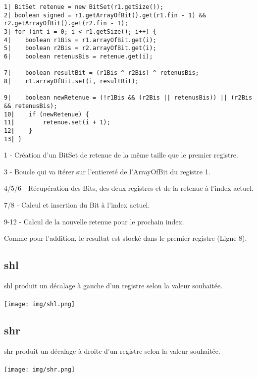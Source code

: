 \documentclass{article}
\begin{document}
\begin{verbatim}
1| BitSet retenue = new BitSet(r1.getSize());
2| boolean signed = r1.getArrayOfBit().get(r1.fin - 1) && r2.getArrayOfBit().get(r2.fin - 1);
3| for (int i = 0; i < r1.getSize(); i++) {
4|    boolean r1Bis = r1.arrayOfBit.get(i);
5|    boolean r2Bis = r2.arrayOfBit.get(i);
6|    boolean retenusBis = retenue.get(i);

7|    boolean resultBit = (r1Bis ^ r2Bis) ^ retenusBis;
8|    r1.arrayOfBit.set(i, resultBit);

9|    boolean newRetenue = (!r1Bis && (r2Bis || retenusBis)) || (r2Bis && retenusBis);
10|    if (newRetenue) {
11|        retenue.set(i + 1);
12|    }
13| }
\end{verbatim}

1 - Création d'un BitSet de retenue de la même taille que le premier registre.

3 - Boucle qui va itérer sur l'entiereté de l'ArrayOfBit du registre 1.

4/5/6 - Récupération des Bits, des deux registres et de la retenue à l'index actuel.

7/8 - Calcul et insertion du Bit à l'index actuel.

9-12 - Calcul de la nouvelle retenue pour le prochain index.

Comme pour l'addition, le resultat est stocké dans le premier registre (Ligne 8).

\newpage
\subsection{shl}
shl produit un décalage à gauche d'un registre selon la valeur souhaitée.
\\
\\
\texttt{[image: img/shl.png]}

\subsection{shr}
shr produit un décalage à droite d'un registre selon la valeur souhaitée.
\\
\\
\texttt{[image: img/shr.png]}
\newpage
\end{document}
